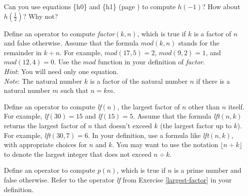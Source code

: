 \begin{ExerciseList}
\Exercise Can you use equations \{h0\} and \{h1\}
(page \pageref{reciprocalsdef})
to compute $h(-1)$?  How about $h(\frac{1}{2})$? Why not?

\Exercise Define an operator to compute \emph{factor}$(k, n)$, which is true
if $k$ is a factor of $n$ and false otherwise.
Assume that the formula $mod(k,n)$ stands for the remainder
in $k \div n$.
For example, $mod(17,5)=2$, $mod(9,2)=1$, and $mod(12,4)=0$.
Use the $mod$ function in your definition of \emph{factor}.\\
\emph{Hint}: You will need only one equation.\\
\emph{Note}: The natural number $k$ is a factor of the natural number $n$
if there is a natural number $m$ such that $n = km$.

\Exercise \label{largest-factor}
        Define an operator to compute \emph{lf}$(n)$,
        the largest factor of $n$ other than $n$ itself.
        For example, \emph{lf}$(30)=15$ and
        \emph{lf}$(15)=5$.
        Assume that the formula
        \emph{lft}$(n,k)$  returns the largest factor of
        $n$ that doesn't exceed $k$ (the largest factor up to $k$).
        For example, \emph{lft}$(30,7)=6$.
        In your definition, use a formula like \emph{lft}$(n,k)$,
        with appropriate choices for $n$ and $k$.
        You may want to use the notation $\lfloor n \div k\rfloor$
        to denote the largest integer that does not exceed $n \div k$.

\Exercise \label{prime-predicate}
        Define an operator to compute $p(n)$, which is true
        if $n$ is a prime number and false otherwise.
        Refer to the operator \emph{lf}
        from Exercise \ref{largest-factor} in your definition.


\end{ExerciseList}
